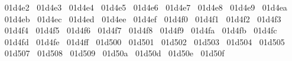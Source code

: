 {  ^^^^^^01d4e2%
  ^^^^^^01d4e3%
  ^^^^^^01d4e4%
  ^^^^^^01d4e5%
  ^^^^^^01d4e6%
  ^^^^^^01d4e7%
  ^^^^^^01d4e8%
  ^^^^^^01d4e9%
  ^^^^^^01d4ea%
  ^^^^^^01d4eb%
  ^^^^^^01d4ec%
  ^^^^^^01d4ed%
  ^^^^^^01d4ee%
  ^^^^^^01d4ef%
  ^^^^^^01d4f0%
  ^^^^^^01d4f1%
  ^^^^^^01d4f2%
  ^^^^^^01d4f3%
  ^^^^^^01d4f4%
  ^^^^^^01d4f5%
  ^^^^^^01d4f6%
  ^^^^^^01d4f7%
  ^^^^^^01d4f8%
  ^^^^^^01d4f9%
  ^^^^^^01d4fa%
  ^^^^^^01d4fb%
  ^^^^^^01d4fc%
  ^^^^^^01d4fd%
  ^^^^^^01d4fe%
  ^^^^^^01d4ff%
  ^^^^^^01d500%
  ^^^^^^01d501%
  ^^^^^^01d502%
  ^^^^^^01d503%
  ^^^^^^01d504%
  ^^^^^^01d505%
  ^^^^^^01d507%
  ^^^^^^01d508%
  ^^^^^^01d509%
  ^^^^^^01d50a%
  ^^^^^^01d50d%
  ^^^^^^01d50e%
  ^^^^^^01d50f%
}

